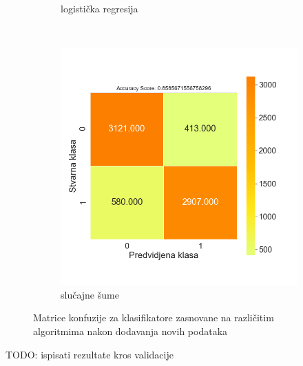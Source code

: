 \documentclass[12pt,oneside]{memoir}
\begin{document}
\begin{figure}[!ht]
\begin{subfigure}[b]{0.45\textwidth}
        \caption{logistička regresija}
        \label{fig:logreg2}
    \end{subfigure}
    \\
    \begin{subfigure}[b]{0.45\textwidth}
        \centering
        \includegraphics[width=\textwidth]{RF_oversampled_confussion_matrix}
        \caption{slučajne šume}
        \label{fig:randfor2}
    \end{subfigure}
    \caption{Matrice konfuzije za klasifikatore zasnovane na različitim algoritmima nakon dodavanja novih podataka}
    \label{fig:confmatrovers}
\end{figure}

% 
TODO: ispisati rezultate kros validacije

\end{document}
